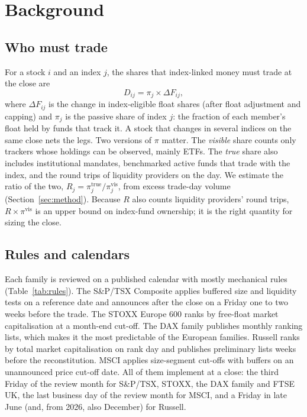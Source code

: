 \documentclass[10pt, a4paper, twocolumn]{article}
\begin{document}
\section{Background}
\label{sec:background}

\subsection{Who must trade}

For a stock $i$ and an index $j$, the shares that index-linked money must trade at the close are
\begin{equation}
D_{ij} = \pi_j \times \Delta F_{ij},
\label{eq:demand}
\end{equation}
where $\Delta F_{ij}$ is the change in index-eligible float shares (after float adjustment and capping) and $\pi_j$ is the passive share of index $j$: the fraction of each member's float held by funds that track it. A stock that changes in several indices on the same close nets the legs. Two versions of $\pi$ matter. The \emph{visible} share counts only trackers whose holdings can be observed, mainly ETFs. The \emph{true} share also includes institutional mandates, benchmarked active funds that trade with the index, and the round trips of liquidity providers on the day. We estimate the ratio of the two, $R_j = \pi^{\text{true}}_j / \pi^{\text{vis}}_j$, from excess trade-day volume (Section~\ref{sec:method}). Because $R$ also counts liquidity providers' round trips, $R \times \pi^{\text{vis}}$ is an upper bound on index-fund ownership; it is the right quantity for sizing the close.

\subsection{Rules and calendars}

Each family is reviewed on a published calendar with mostly mechanical rules (Table~\ref{tab:rules}). The S\&P/TSX Composite applies buffered size and liquidity tests on a reference date and announces after the close on a Friday one to two weeks before the trade. The STOXX Europe 600 ranks by free-float market capitalisation at a month-end cut-off. The DAX family publishes monthly ranking lists, which makes it the most predictable of the European families. Russell ranks by total market capitalisation on rank day and publishes preliminary lists weeks before the reconstitution. MSCI applies size-segment cut-offs with buffers on an unannounced price cut-off date. All of them implement at a close: the third Friday of the review month for S\&P/TSX, STOXX, the DAX family and FTSE UK, the last business day of the review month for MSCI, and a Friday in late June (and, from 2026, also December) for Russell.
\end{document}

